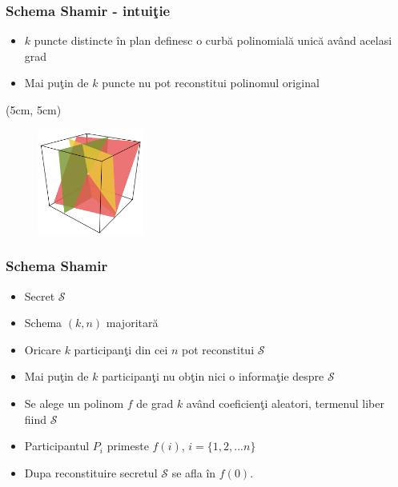 \documentclass{beamer}
\begin{document}
\begin{frame}
    \frametitle{Schema Shamir - intui\c{t}ie}
    \begin{itemize}
        \item $k$ puncte distincte \^{i}n plan definesc o curb\u{a} polinomial\u{a} unic\u{a} av\^{a}nd acelasi grad
        \pause
        \item Mai pu\c{t}in de $k$ puncte nu pot reconstitui polinomul original
    \end{itemize}
    \pause
     {
        \begin{textblock*}{4cm}(5cm, 5cm)
        \begin{figure}
            \includegraphics[width=3.5cm,height=3.5cm,keepaspectratio]{img/shamir/shamir.png}
       \end{figure}
        \end{textblock*}
     }
\end{frame}

\begin{frame}
    \frametitle{Schema Shamir}
    \begin{itemize}
        \item Secret $\mathcal{S}$
        \pause
        \item Schema $(k,n)$ majoritar\u{a}
        \pause
        \item Oricare $k$ participan\c{t}i din cei $n$ pot reconstitui $\mathcal{S}$
        \pause
        \item Mai pu\c{t}in de $k$ participan\c{t}i nu ob\c{t}in nici o informa\c{t}ie despre $\mathcal{S}$
        \pause
        \item Se alege un polinom $f$ de grad $k$ av\^{a}nd coeficien\c{t}i aleatori, termenul liber fiind $\mathcal{S}$
        \pause
        \item Participantul $P_i$ primeste $f(i)$, $i = \{1, 2, ...n\}$
        \pause
        \item Dupa reconstituire secretul $\mathcal{S}$ se afla \^{i}n $f(0)$.
    \end{itemize}
\end{frame}
\end{document}
